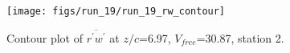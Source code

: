 \begin{figure}[H]
\centering
\texttt{[image: figs/run\_19/run\_19\_rw\_contour]}
\caption{Contour plot of $\overline{r^\prime w^\prime}$ at $z/c$=6.97, $V_{free}$=30.87, station 2.}
\label{fig:run_19_rw_contour}
\end{figure}


